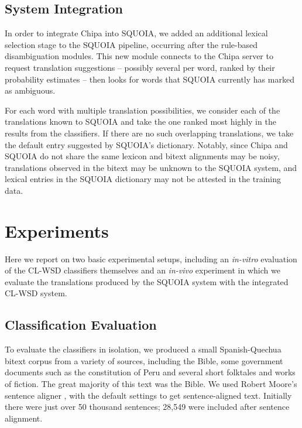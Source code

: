 \subsection{System Integration}
In order to integrate Chipa into SQUOIA, we added an additional lexical
selection stage to the SQUOIA pipeline, occurring after the rule-based
disambiguation modules. This new module connects to the Chipa server to request
translation suggestions -- possibly several per word, ranked by their
probability estimates -- then looks for words that SQUOIA currently has marked
as ambiguous.

For each word with multiple translation possibilities, we consider each of the
translations known to SQUOIA and take the one ranked most highly in the
results from the classifiers. If there are no such overlapping translations, we
take the default entry suggested by SQUOIA's dictionary.
Notably, since Chipa and SQUOIA do not share the same lexicon and bitext alignments
may be noisy, translations
observed in the bitext may be unknown to the SQUOIA system, and lexical entries in the
SQUOIA dictionary may not be attested in the training data.







\section{Experiments}
Here we report on two basic experimental setups, including an \emph{in-vitro}
evaluation of the CL-WSD classifiers themselves and an \emph{in-vivo}
experiment in which we evaluate the translations produced by the SQUOIA system
with the integrated CL-WSD system.

\subsection{Classification Evaluation}
To evaluate the classifiers in isolation, we produced a small Spanish-Quechua
bitext corpus from a variety of sources, including the Bible, some government
documents such as the constitution of Peru and several short folktales and
works of fiction. The great majority of this text was the Bible.
We used Robert Moore's sentence aligner \cite{DBLP:conf/amta/Moore02}, with the
default settings to get sentence-aligned text.
Initially there were just over 50 thousand sentences; 28,549 were included
after sentence alignment.

